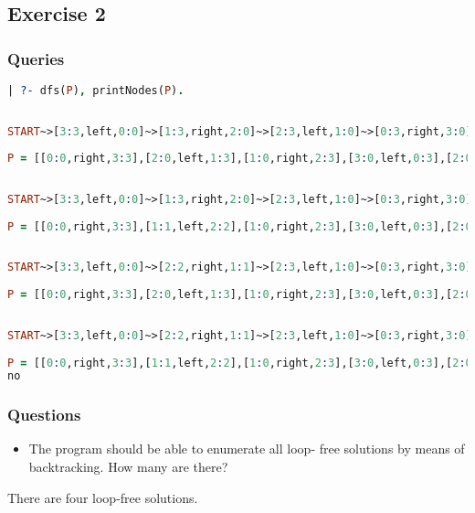 \pagebreak

\subsection{Exercise 2}

\subsubsection{Queries}
\begin{lstlisting}[language=Prolog, breaklines]
| ?- dfs(P), printNodes(P).
  
  
START~>[3:3,left,0:0]~>[1:3,right,2:0]~>[2:3,left,1:0]~>[0:3,right,3:0]~>[1:3,left,2:0]~>[1:1,right,2:2]~>[2:2,left,1:1]~>[2:0,right,1:3]~>[3:0,left,0:3]~>[1:0,right,2:3]~>[2:0,left,1:3]~>[0:0,right,3:3]~>~>END.
  
P = [[0:0,right,3:3],[2:0,left,1:3],[1:0,right,2:3],[3:0,left,0:3],[2:0,right,1:3],[2:2,left,1:1],[1:1,right,2:2],[1:3,left,2:0],[0:3,right,3:0],[2:3,left,1:0],[1:3,right,2:0],[3:3,left,0:0]] ? ;
  
  
START~>[3:3,left,0:0]~>[1:3,right,2:0]~>[2:3,left,1:0]~>[0:3,right,3:0]~>[1:3,left,2:0]~>[1:1,right,2:2]~>[2:2,left,1:1]~>[2:0,right,1:3]~>[3:0,left,0:3]~>[1:0,right,2:3]~>[1:1,left,2:2]~>[0:0,right,3:3]~>~>END.
  
P = [[0:0,right,3:3],[1:1,left,2:2],[1:0,right,2:3],[3:0,left,0:3],[2:0,right,1:3],[2:2,left,1:1],[1:1,right,2:2],[1:3,left,2:0],[0:3,right,3:0],[2:3,left,1:0],[1:3,right,2:0],[3:3,left,0:0]] ? ;
  
  
START~>[3:3,left,0:0]~>[2:2,right,1:1]~>[2:3,left,1:0]~>[0:3,right,3:0]~>[1:3,left,2:0]~>[1:1,right,2:2]~>[2:2,left,1:1]~>[2:0,right,1:3]~>[3:0,left,0:3]~>[1:0,right,2:3]~>[2:0,left,1:3]~>[0:0,right,3:3]~>~>END.
  
P = [[0:0,right,3:3],[2:0,left,1:3],[1:0,right,2:3],[3:0,left,0:3],[2:0,right,1:3],[2:2,left,1:1],[1:1,right,2:2],[1:3,left,2:0],[0:3,right,3:0],[2:3,left,1:0],[2:2,right,1:1],[3:3,left,0:0]] ? ;
  
  
START~>[3:3,left,0:0]~>[2:2,right,1:1]~>[2:3,left,1:0]~>[0:3,right,3:0]~>[1:3,left,2:0]~>[1:1,right,2:2]~>[2:2,left,1:1]~>[2:0,right,1:3]~>[3:0,left,0:3]~>[1:0,right,2:3]~>[1:1,left,2:2]~>[0:0,right,3:3]~>~>END.
  
P = [[0:0,right,3:3],[1:1,left,2:2],[1:0,right,2:3],[3:0,left,0:3],[2:0,right,1:3],[2:2,left,1:1],[1:1,right,2:2],[1:3,left,2:0],[0:3,right,3:0],[2:3,left,1:0],[2:2,right,1:1],[3:3,left,0:0]] ? ;
no
\end{lstlisting}
\subsubsection{Questions}
\begin{itemize}
  \item The program should be able to enumerate all loop-
  free solutions by means of backtracking. How many are there?
\end{itemize}
There are four loop-free solutions.